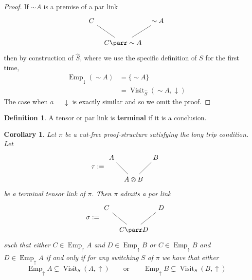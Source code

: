 \documentclass[12pt]{article}
\theoremstyle{plain}
\newtheorem{cor}[thm]{Corollary}
\theoremstyle{definition}
\newtheorem{defn}[thm]{Definition} %
\newcommand{\negation}{\sim}
\begin{document}
\begin{proof}
If $\negation A$ is a premise of a par link
\[
\begin{tikzcd}[column sep = tiny]
C\arrow[dr,dash] && \negation A\arrow[dl,dash]\\
& C \parr \negation A
\end{tikzcd}
\]
then by construction of $\hat{S}$, where we use the specific definition of $S$ for the first time,
\begin{align*}
    \operatorname{Emp}_{\downarrow}(\negation A) &= \lbrace \negation A\rbrace\\
    &= \operatorname{Visit}_{\hat{S}}(\negation A,\downarrow)
\end{align*}
The case when $a = \downarrow$ is exactly similar and so we omit the proof.
\end{proof}
\begin{defn}
A tensor or par link is \textbf{terminal} if it is a conclusion.
\end{defn}
\begin{cor}\label{lem:par_link_existence}
Let $\pi$ be a cut-free proof-structure satisfying the long trip condition. Let
\[
\tau := \begin{tikzcd}[column sep = tiny]
A\arrow[dr,dash] && B\arrow[dl,dash]\\
& A \otimes B
\end{tikzcd}
\]
be a terminal tensor link of $\pi$. Then $\pi$ admits a par link
\[
\sigma := \begin{tikzcd}[column sep = tiny]
C\arrow[dr,dash] && D\arrow[dl,dash]\\
& C \parr D
\end{tikzcd}
\]
such that either $C \in \operatorname{Emp}_{\uparrow}A$ and $D \in \operatorname{Emp}_{\uparrow}B$ or $C \in \operatorname{Emp}_{\uparrow}B$ and $D \in \operatorname{Emp}_{\uparrow}A$ if and only if for any switching $S$ of $\pi$ we have that either
\[\operatorname{Emp}_{\uparrow}A \subsetneq \operatorname{Visit}_S(A,\uparrow)\qquad\text{or}\qquad \operatorname{Emp}_{\uparrow}B \subsetneq \operatorname{Visit}_S(B,\uparrow)\]
\end{cor}
\end{document}
